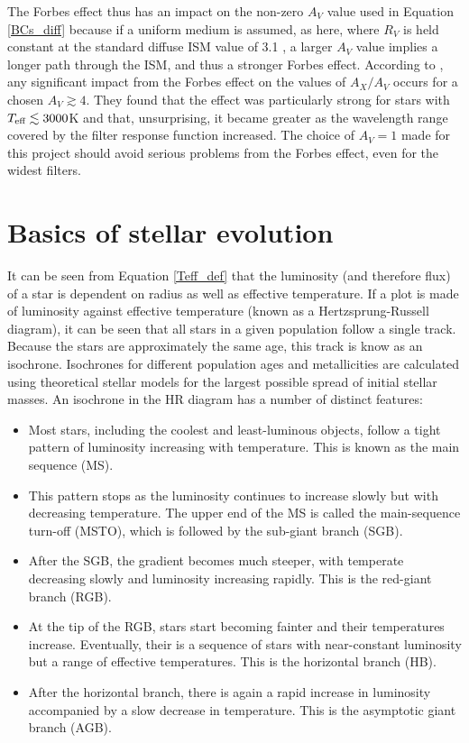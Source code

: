 \documentclass[12pt, a4paper]{report}
\begin{document}
The Forbes effect thus has an impact on the non-zero $A_{V}$ value used in Equation \ref{BCs_diff} because if a uniform medium is assumed, as here, where $R_{V}$ is held constant at the standard diffuse ISM value of 3.1 \citep{1989ApJ...345..245C}, a larger $A_{V}$ value implies a longer path through the ISM, and thus a stronger Forbes effect. According to \cite{2008PASP..120..583G}, any significant impact from the Forbes effect on the values of $A_{X}/A_{V}$ occurs for a chosen $A_{V} \gtrsim 4$. They found that the effect was particularly strong for stars with $T_{\textnormal{eff}} \lesssim 3000$K and that, unsurprising, it became greater as the wavelength range covered by the filter response function increased. The choice of $A_{V} = 1$ made for this project should avoid serious problems from the Forbes effect, even for the widest filters.


\section{Basics of stellar evolution} \label{stel_evol}
It can be seen from Equation \ref{Teff_def} that the luminosity (and therefore flux) of a star is dependent on radius as well as effective temperature. If a plot is made of luminosity against effective temperature (known as a Hertzsprung-Russell diagram), it can be seen that all stars in a given population follow a single track. Because the stars are approximately the same age, this track is know as an isochrone. Isochrones for different population ages and metallicities are calculated using theoretical stellar models for the largest possible spread of initial stellar masses. An isochrone in the HR diagram has a number of distinct features:

\begin{itemize}
\item Most stars, including the coolest and least-luminous objects, follow a tight pattern of luminosity increasing with temperature. This is known as the main sequence (MS).
\item This pattern stops as the luminosity continues to increase slowly but with decreasing temperature. The upper end of the MS is called the main-sequence turn-off (MSTO), which is followed by the sub-giant branch (SGB).
\item After the SGB, the gradient becomes much steeper, with temperate decreasing slowly and luminosity increasing rapidly. This is the red-giant branch (RGB).
\item At the tip of the RGB, stars start becoming fainter and their temperatures increase. Eventually, their is a sequence of stars with near-constant luminosity but a range of effective temperatures. This is the horizontal branch (HB).
\item After the horizontal branch, there is again a rapid increase in luminosity accompanied by a slow decrease in temperature. This is the asymptotic giant branch (AGB).
\end{itemize}
\end{document}
